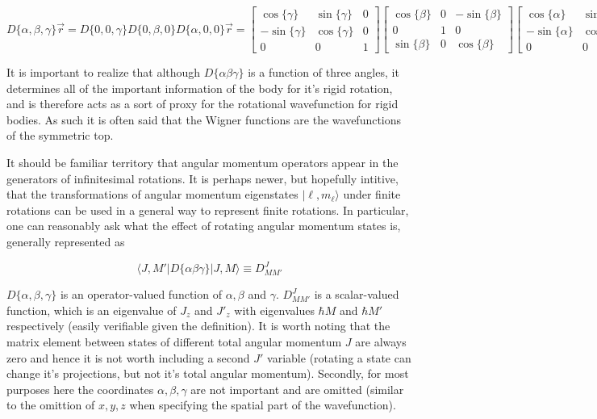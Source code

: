 \documentclass[prl, longbibliography]{revtex4-2}
\begin{document}
$$
D\{\alpha,\beta,\gamma\}\vec{r}=D\{0,0,\gamma\}D\{0,\beta,0\}D\{\alpha,0,0\}\vec{r}=
\begin{bmatrix}
\cos\{\gamma\} & \sin\{\gamma\} & 0 \\
-\sin\{\gamma\} & \cos\{\gamma\} & 0 \\
0 & 0 & 1
\end{bmatrix}
\begin{bmatrix}
\cos\{\beta\} & 0 & -\sin\{\beta\} \\
0 & 1 & 0 \\
\sin\{\beta\} & 0 & \cos\{\beta\}
\end{bmatrix}
\begin{bmatrix}
\cos\{\alpha\} & \sin\{\alpha\} & 0 \\
-\sin\{\alpha\} & \cos\{\alpha\} & 0 \\
0 & 0 & 1
\end{bmatrix}
\begin{bmatrix}
x\\
y\\
z
\end{bmatrix}
$$

It is important to realize that although $D\{\alpha\beta\gamma\}$ is a function of three angles, it determines all of the important information of the body for it's rigid rotation, and is therefore acts as a sort of proxy for the rotational wavefunction for rigid bodies. As such it is often said that the Wigner functions are the wavefunctions of the symmetric top. 

It should be familiar territory that angular momentum operators appear in the generators of infinitesimal rotations. It is perhaps newer, but hopefully intitive, that the transformations of angular momentum eigenstates $|\ell, m_\ell\rangle$ under finite rotations can be used in a general way to represent finite rotations. In particular, one can reasonably ask what the effect of rotating angular momentum states is, generally represented as

$$
\langle J,M' |D\{\alpha\beta\gamma\} | J, M \rangle \equiv D^J_{MM'}
$$

$D\{\alpha,\beta,\gamma\}$ is an operator-valued function of $\alpha,\beta$ and $\gamma$. $D^J_{MM'}$ is a scalar-valued function, which is an eigenvalue of $J_z$ and $J'_z$ with eigenvalues $\hbar M$ and $\hbar M'$ respectively (easily verifiable given the definition). It is worth noting that the matrix element between states of different total angular momentum $J$ are always zero and hence it is not worth including a second $J'$ variable (rotating a state can change it's projections, but not it's total angular momentum). Secondly, for most purposes here the coordinates $\alpha,\beta,\gamma$ are not important and are omitted (similar to the omittion of $x,y,z$ when specifying the spatial part of the wavefunction).
\end{document}
